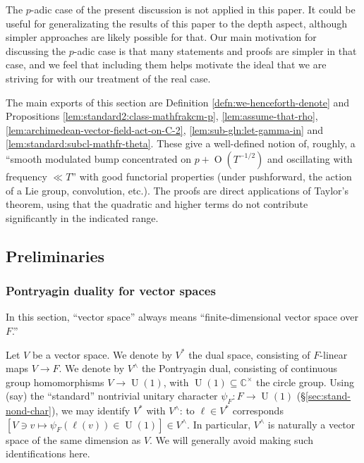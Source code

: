 \documentclass[reqno]{amsart}
\DeclareMathOperator{\U}{U}
\def\O{\operatorname{O}}
\theoremstyle{plain} \newtheorem{theorem} {Theorem}
\theoremstyle{definition} \newtheorem{definition} [theorem] {Definition}
\theoremstyle{itplain} %
\numberwithin{equation}{section}
\numberwithin{theorem}{section}
\begin{document}
The $p$-adic case of the present discussion is not applied in this paper.  It could be useful for generalizating the results of this paper to the depth aspect, although simpler approaches are likely possible for that.  Our main motivation for discussing the $p$-adic case is that many statements and proofs are simpler in that case, and we feel that including them helps motivate the ideal that we are striving for with our treatment of the real case.

The main exports of this section are Definition \ref{defn:we-henceforth-denote} and Propositions \ref{lem:standard2:class-mathfrakcm-p}, \ref{lem:assume-that-rho}, \ref{lem:archimedean-vector-field-act-on-C-2}, \ref{lem:sub-gln:let-gamma-in} and \ref{lem:standard:subcl-mathfr-theta}.  These give a well-defined notion of, roughly, a ``smooth modulated bump concentrated on $p + \O(T^{-1/2})$ and oscillating with frequency $\ll T$'' with good functorial properties (under pushforward, the action of a Lie group, convolution, etc.).  The proofs are direct applications of Taylor's theorem, using that the quadratic and higher terms do not contribute significantly in the indicated range.





\subsection{Preliminaries}

\subsubsection{Pontryagin duality for vector spaces}\label{sec:pontry-dual-vect}
In this section, ``vector space'' always means ``finite-dimensional vector space over $F$.''

Let $V$ be a vector space.  We denote by $V^*$ the dual space, consisting of $F$-linear maps $V \rightarrow F$.  We denote by $V^\wedge$ the Pontryagin dual, consisting of continuous group homomorphisms $V \rightarrow \U(1)$, with $\U(1) \subseteq \mathbb{C}^\times$ the circle group.  Using (say) the ``standard'' nontrivial unitary character $\psi_F : F \rightarrow \U(1)$ (\S\ref{sec:stand-nond-char}), we may identify $V^*$ with $V^\wedge$: to $\ell \in V^*$ corresponds $[V \ni v \mapsto \psi_F(\ell(v)) \in \U(1)] \in V^\wedge$.  In particular, $V^\wedge$ is naturally a vector space of the same dimension as $V$.  We will generally avoid making such identifications here.
\end{document}
